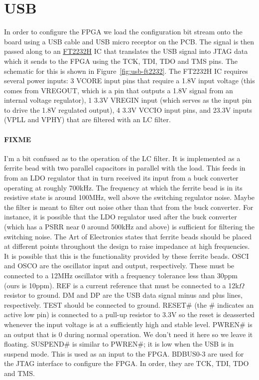 \section{USB}

In order to configure the FPGA we load the configuration bit stream onto the board using a USB cable and USB micro
receptor on the PCB. The signal is then passed along to an
\href{http://www.ftdichip.com/Support/Documents/DataSheets/ICs/DS_FT2232H.pdf}{FT2232H} IC that translates the USB
signal into JTAG data which it sends to the FPGA using the TCK, TDI, TDO and TMS pins. The schematic for this is shown
in Figure~\ref{fig:usb-ft2232}. The FT2232H IC requires several power inputs: 3 VCORE input pins that require a 1.8V
input voltage (this comes from VREGOUT, which is a pin that outputs a 1.8V signal from an internal voltage regulator), 1
3.3V VREGIN input (which serves as the input pin to drive the 1.8V regulated output), 4 3.3V VCCIO input pins, and 23.3V
inputs (VPLL and VPHY) that are filtered with an LC filter.

\paragraph{FIXME} I'm a bit confused as to the operation of the LC filter. It is implemented as a ferrite bead with two
parallel capacitors in parallel with the load. This feeds in from an LDO regulator that in turn received its input from
a buck converter operating at roughly 700kHz. The frequency at which the ferrite bead is in its resistive state is
around 100MHz, well above the switching regulator noise. Maybe the filter is meant to filter out noise other than that
from the buck converter. For instance, it is possible that the LDO regulator used after the buck converter (which has a
PSRR near 0 around 500kHz and above) is sufficient for filtering the switching noise. The Art of Electronics states that
ferrite beads should be placed at different points throughout the design to raise impedance at high frequencies. It is
possible that this is the functionality provided by these ferrite beads.  OSCI and OSCO are the oscillator input and
output, respectively. These must be connected to a 12MHz oscillator with a frequency tolerance less than 30ppm (ours is
10ppm). REF is a current reference that must be connected to a 12k$\Omega$ resistor to ground. DM and DP are the USB
data signal minus and plus lines, respectively. TEST should be connected to ground. RESET\# (the \# indicates an active
low pin) is connected to a pull-up resistor to 3.3V so the reset is deasserted whenever the input voltage is at a
sufficiently high and stable level. PWREN\# is an output that is 0 during normal operation. We don't need it here so we
leave it floating. SUSPEND\# is similar to PWREN\#; it is low when the USB is in suspend mode. This is used as an input
to the FPGA. BDBUS0-3 are used for the JTAG interface to configure the FPGA. In order, they are TCK, TDI, TDO and TMS.

